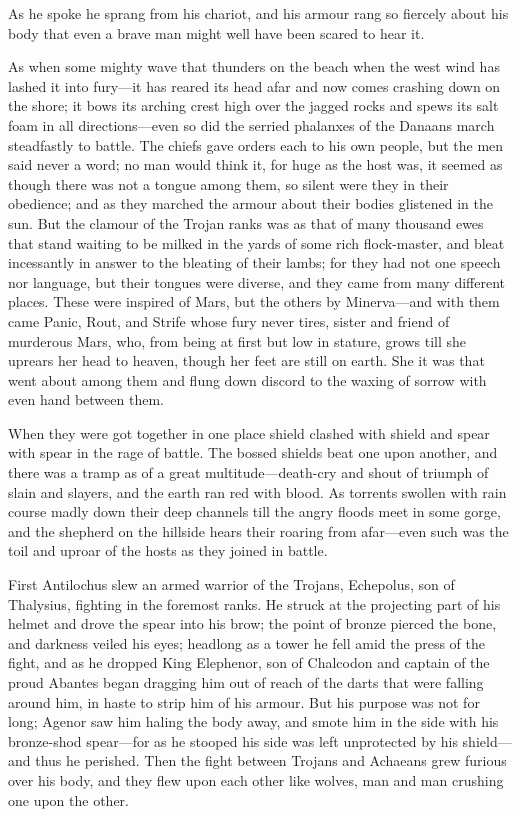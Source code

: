 As he spoke he sprang from his chariot, and his armour rang so fiercely
about his body that even a brave man might well have been scared to hear
it.

As when some mighty wave that thunders on the beach when the west wind has
lashed it into fury—it has reared its head afar and now comes
crashing down on the shore; it bows its arching crest high over the jagged
rocks and spews its salt foam in all directions—even so did the
serried phalanxes of the Danaans march steadfastly to battle. The chiefs
gave orders each to his own people, but the men said never a word; no man
would think it, for huge as the host was, it seemed as though there was
not a tongue among them, so silent were they in their obedience; and as
they marched the armour about their bodies glistened in the sun. But the
clamour of the Trojan ranks was as that of many thousand ewes that stand
waiting to be milked in the yards of some rich flock-master, and bleat
incessantly in answer to the bleating of their lambs; for they had not one
speech nor language, but their tongues were diverse, and they came from
many different places. These were inspired of Mars, but the others by
Minerva—and with them came Panic, Rout, and Strife whose fury never
tires, sister and friend of murderous Mars, who, from being at first but
low in stature, grows till she uprears her head to heaven, though her feet
are still on earth. She it was that went about among them and flung down
discord to the waxing of sorrow with even hand between them.

When they were got together in one place shield clashed with shield and
spear with spear in the rage of battle. The bossed shields beat one upon
another, and there was a tramp as of a great multitude—death-cry and
shout of triumph of slain and slayers, and the earth ran red with blood.
As torrents swollen with rain course madly down their deep channels till
the angry floods meet in some gorge, and the shepherd on the hillside
hears their roaring from afar—even such was the toil and uproar of
the hosts as they joined in battle.

First Antilochus slew an armed warrior of the Trojans, Echepolus, son of
Thalysius, fighting in the foremost ranks. He struck at the projecting
part of his helmet and drove the spear into his brow; the point of bronze
pierced the bone, and darkness veiled his eyes; headlong as a tower he
fell amid the press of the fight, and as he dropped King Elephenor, son of
Chalcodon and captain of the proud Abantes began dragging him out of reach
of the darts that were falling around him, in haste to strip him of his
armour. But his purpose was not for long; Agenor saw him haling the body
away, and smote him in the side with his bronze-shod spear—for as he
stooped his side was left unprotected by his shield—and thus he
perished. Then the fight between Trojans and Achaeans grew furious over
his body, and they flew upon each other like wolves, man and man crushing
one upon the other.

